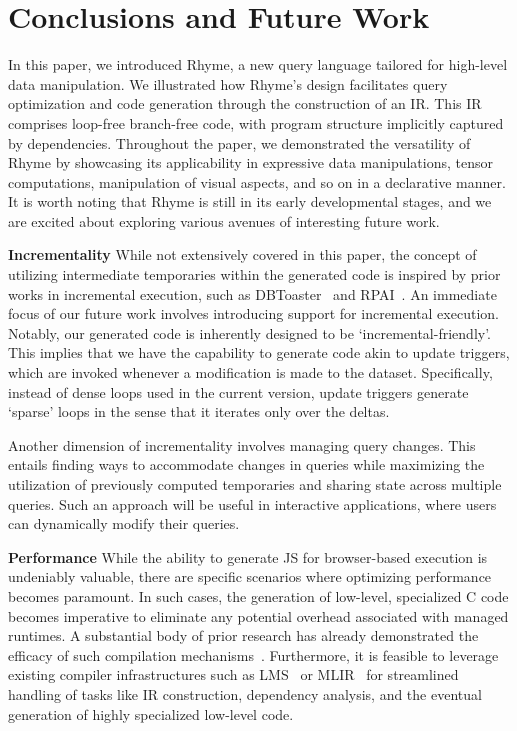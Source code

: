 \documentclass[runningheads]{llncs}
\newcommand{\lang}{Rhyme}
\begin{document}

\section{Conclusions and Future Work}\label{sec:conclusions}

In this paper, we introduced \lang{}, a new query language tailored for high-level
data manipulation.
We illustrated how \lang{}'s design facilitates query optimization and code generation
through the construction of an IR.
This IR comprises loop-free branch-free code, with program structure implicitly captured
by dependencies.
Throughout the paper, we demonstrated the versatility of \lang{} by showcasing its
applicability in expressive data manipulations,
tensor computations, manipulation of visual aspects, and so on in a declarative manner.
It is worth noting that \lang{} is still in its early developmental stages,
and we are excited about exploring various avenues of interesting future work.

\textbf{Incrementality}
While not extensively covered in this paper, the concept of utilizing
intermediate temporaries within the generated code is inspired by prior
works in incremental execution, such as DBToaster~\cite{dbtoaster_vldb}
and RPAI~\cite{rpai}.
An immediate focus of our future work involves introducing support for
incremental execution.
Notably, our generated code is inherently designed to be `incremental-friendly'.
This implies that we have the capability to generate code akin to update
triggers, which are invoked whenever a modification is made to the dataset.
Specifically, instead of dense loops used in the current version, update triggers
generate `sparse' loops in the sense that it iterates only over the deltas.

Another dimension of incrementality involves managing query changes.
This entails finding ways to accommodate changes in queries while maximizing
the utilization of previously computed temporaries and sharing state across
multiple queries. 
Such an approach will be useful in interactive applications, where users
can dynamically modify their queries.

\textbf{Performance}
While the ability to generate JS for browser-based execution is undeniably valuable,
there are specific scenarios where optimizing performance becomes paramount.
In such cases, the generation of low-level, specialized C code becomes imperative to
eliminate any potential overhead associated with managed runtimes.
A substantial body of prior research has already demonstrated the efficacy of
such compilation mechanisms~\cite{500lines,lb2,flare_osdi,sai_guannan}.
Furthermore, it is feasible to leverage existing compiler infrastructures such
as LMS~\cite{lms} or MLIR~\cite{mlir} for streamlined handling of tasks like
IR construction, dependency analysis, and the eventual generation of highly
specialized low-level code.
\end{document}
